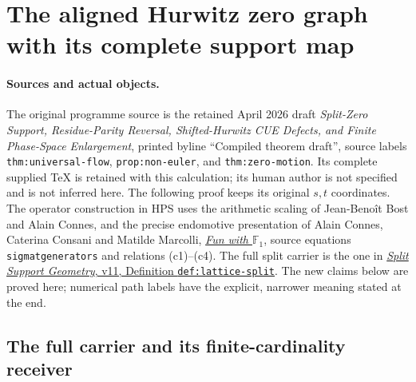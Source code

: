 \documentclass[11pt]{article}
\theoremstyle{definition}
\begin{document}
\clearpage

\section{The aligned Hurwitz zero graph with its complete support map}
\label{sec:hurwitz-alignment-full-map}

\paragraph{Sources and actual objects.}
The original programme source is the retained April 2026 draft
\emph{Split-Zero Support, Residue-Parity Reversal, Shifted-Hurwitz CUE
Defects, and Finite Phase-Space Enlargement}, printed byline
``Compiled theorem draft'', source labels \texttt{thm:universal-flow},
\texttt{prop:non-euler}, and \texttt{thm:zero-motion}.
Its complete supplied TeX is retained with this calculation; its human
author is not specified and is not inferred here. The following proof
keeps its original $s,t$ coordinates. The operator construction in HPS
uses the arithmetic scaling of Jean-Beno\^it Bost and Alain Connes,
and the precise endomotive presentation of Alain Connes, Caterina
Consani and Matilde Marcolli,
\href{https://arxiv.org/abs/0806.2401v1}{\emph{Fun with $\mathbb F_1$}},
source equations \texttt{sigmatgenerators} and relations (c1)--(c4).
The full split carrier is the one in
\href{https://github.com/KokunoYumeto/zeta-function-research-reader/blob/a2851f9eb352e7e4376bc629de86fa4ed9c1c434/workbenches/splitzero-tandem/foundations/split-support-geometry-v11/split_support_geometry_arithmetic_curve_v11.tex}{\emph{Split Support Geometry}, v11, Definition \texttt{def:lattice-split}}.
The new claims below are proved here; numerical path labels have the
explicit, narrower meaning stated at the end.

\subsection{The full carrier and its finite-cardinality receiver}
\end{document}
